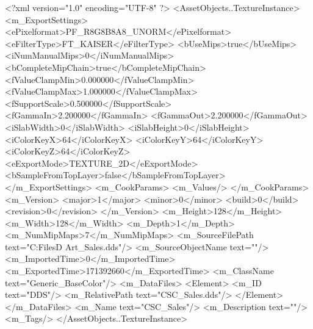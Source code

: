 <?xml version="1.0" encoding="UTF-8" ?>
<AssetObjects..TextureInstance>
	<m_ExportSettings>
		<ePixelformat>PF_R8G8B8A8_UNORM</ePixelformat>
		<eFilterType>FT_KAISER</eFilterType>
		<bUseMips>true</bUseMips>
		<iNumManualMips>0</iNumManualMips>
		<bCompleteMipChain>true</bCompleteMipChain>
		<fValueClampMin>0.000000</fValueClampMin>
		<fValueClampMax>1.000000</fValueClampMax>
		<fSupportScale>0.500000</fSupportScale>
		<fGammaIn>2.200000</fGammaIn>
		<fGammaOut>2.200000</fGammaOut>
		<iSlabWidth>0</iSlabWidth>
		<iSlabHeight>0</iSlabHeight>
		<iColorKeyX>64</iColorKeyX>
		<iColorKeyY>64</iColorKeyY>
		<iColorKeyZ>64</iColorKeyZ>
		<eExportMode>TEXTURE_2D</eExportMode>
		<bSampleFromTopLayer>false</bSampleFromTopLayer>
	</m_ExportSettings>
	<m_CookParams>
		<m_Values/>
	</m_CookParams>
	<m_Version>
		<major>1</major>
		<minor>0</minor>
		<build>0</build>
		<revision>0</revision>
	</m_Version>
	<m_Height>128</m_Height>
	<m_Width>128</m_Width>
	<m_Depth>1</m_Depth>
	<m_NumMipMaps>7</m_NumMipMaps>
	<m_SourceFilePath text="C:\Users\Shadow\Desktop\Working Files\2D Art\Adjacencies\CSC_Sales.dds"/>
	<m_SourceObjectName text=""/>
	<m_ImportedTime>0</m_ImportedTime>
	<m_ExportedTime>171392660</m_ExportedTime>
	<m_ClassName text="Generic_BaseColor"/>
	<m_DataFiles>
		<Element>
			<m_ID text="DDS"/>
			<m_RelativePath text="CSC_Sales.dds"/>
		</Element>
	</m_DataFiles>
	<m_Name text="CSC_Sales"/>
	<m_Description text=""/>
	<m_Tags/>
</AssetObjects..TextureInstance>

